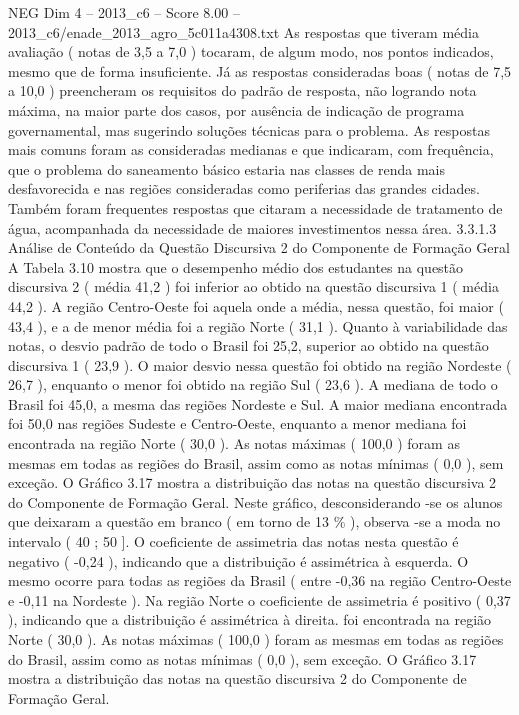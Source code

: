 \begin{textsample}{NEG Dim 4 – 2013\_c6 – Score 8.00 – 2013\_c6/enade\_2013\_agro\_5c011a4308.txt}
As respostas que tiveram média avaliação ( notas de 3,5 a 7,0 ) tocaram, de algum modo, nos pontos indicados, mesmo que de forma insuficiente.
Já as respostas consideradas boas ( notas de 7,5 a 10,0 ) preencheram os requisitos do padrão de resposta, não logrando nota máxima, na maior parte dos casos, por ausência de indicação de programa governamental, mas sugerindo soluções técnicas para o problema.
As respostas mais comuns foram as consideradas medianas e que indicaram, com frequência, que o problema do saneamento básico estaria nas classes de renda mais desfavorecida e nas regiões consideradas como periferias das grandes cidades.
Também foram frequentes respostas que citaram a necessidade de tratamento de água, acompanhada da necessidade de maiores investimentos nessa área. 3.3.1.3 Análise de Conteúdo da Questão Discursiva 2 do Componente de Formação Geral A Tabela 3.10 mostra que o desempenho médio dos estudantes na questão discursiva 2 ( média 41,2 ) foi inferior ao obtido na questão discursiva 1 ( média 44,2 ).
A região Centro-Oeste foi aquela onde a média, nessa questão, foi maior ( 43,4 ), e a de menor média foi a região Norte ( 31,1 ).
Quanto à variabilidade das notas, o desvio padrão de todo o Brasil foi 25,2, superior ao obtido na questão discursiva 1 ( 23,9 ).
O maior desvio nessa questão foi obtido na região Nordeste ( 26,7 ), enquanto o menor foi obtido na região Sul ( 23,6 ).
A mediana de todo o Brasil foi 45,0, a mesma das regiões Nordeste e Sul.
A maior mediana encontrada foi 50,0 nas regiões Sudeste e Centro-Oeste, enquanto a menor mediana foi encontrada na região Norte ( 30,0 ).
As notas máximas ( 100,0 ) foram as mesmas em todas as regiões do Brasil, assim como as notas mínimas ( 0,0 ), sem exceção.
O Gráfico 3.17 mostra a distribuição das notas na questão discursiva 2 do Componente de Formação Geral.
Neste gráfico, desconsiderando -se os alunos que deixaram a questão em branco ( em torno de 13 \% ), observa -se a moda no intervalo ( 40 ; 50 ].
O coeficiente de assimetria das notas nesta questão é negativo ( -0,24 ), indicando que a distribuição é assimétrica à esquerda.
O mesmo ocorre para todas as regiões da Brasil ( entre -0,36 na região Centro-Oeste e -0,11 na Nordeste ).
Na região Norte o coeficiente de assimetria é positivo ( 0,37 ), indicando que a distribuição é assimétrica à direita. foi encontrada na região Norte ( 30,0 ).
As notas máximas ( 100,0 ) foram as mesmas em todas as regiões do Brasil, assim como as notas mínimas ( 0,0 ), sem exceção.
O Gráfico 3.17 mostra a distribuição das notas na questão discursiva 2 do Componente de Formação Geral.

\end{textsample}
